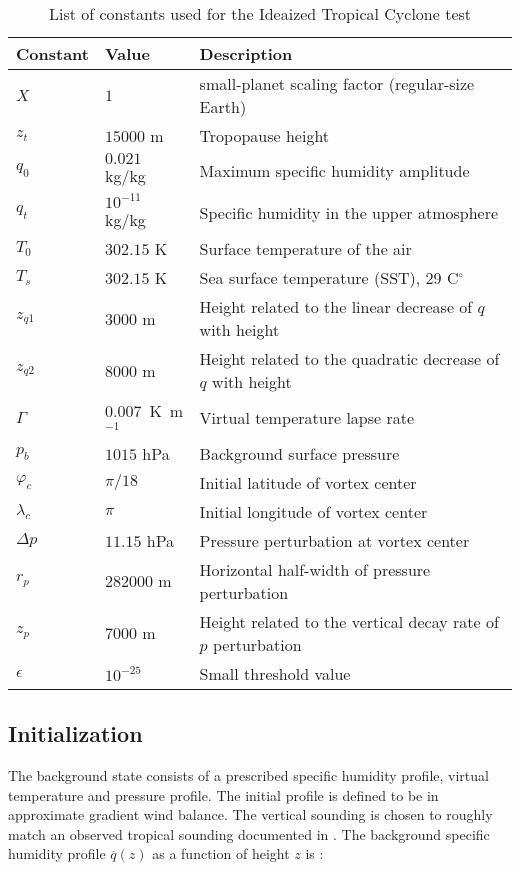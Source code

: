 \documentclass[times,doublespace]{fldauth}
\begin{document}
\begin{table}[h]

\caption{List of constants used for the Ideaized Tropical Cyclone test}

\begin{tabular*}{\textwidth}{@{\extracolsep{\fill}}lll}
\hline Constant & Value & Description \\
\hline
$X$ & $1$ & small-planet scaling factor (regular-size Earth)\\
$z_t$ & $15000$ m & Tropopause height \\
$q_0$ & $0.021$ kg/kg & Maximum specific humidity amplitude \\
$q_t$ & $10^{-11}$ kg/kg & Specific humidity in the upper atmosphere \\
$T_0$ & $302.15$ K & Surface temperature of the air \\
$T_s$ & $302.15$ K & Sea surface temperature (SST), 29 C$^\circ$\\
$z_{q1}$ & $3000$ m & Height related to the linear decrease of $q$ with height \\
$z_{q2}$ & $8000$ m & Height related to the quadratic decrease of $q$ with height \\
$\Gamma$ & $0.007$\ K\ m$^{-1}$ & Virtual temperature lapse rate \\
$p_{b}$ & $1015$ hPa & Background surface pressure \\
$\varphi_c$ & $\pi / 18$ & Initial latitude of vortex center \\
$\lambda_c$ & $\pi$ & Initial longitude of vortex center \\
$\Delta p$ & $11.15$ hPa & Pressure perturbation at vortex center \\
$r_p$ & $282000$ m & Horizontal half-width of pressure perturbation \\
$z_p$ & $7000$ m & Height related to the vertical decay rate of $p$ perturbation \\
$\epsilon$ & $10^{-25}$ & Small threshold value \\
\hline 
\end{tabular*}

\end{table}

\subsection{Initialization}

The background state consists of a prescribed specific humidity profile, virtual temperature and pressure profile.  The initial profile is defined to be in approximate gradient wind balance.  The vertical sounding is chosen to roughly match an observed tropical sounding documented in \cite{jordan1958mean}.  The background specific humidity profile $\overline{q}(z)$ as a function of height $z$ is :
\end{document}
